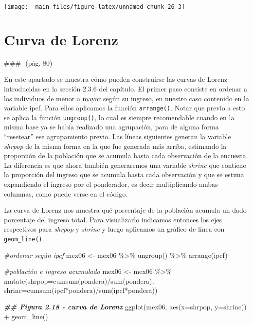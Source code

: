 \documentclass[
]{book}
\newenvironment{Shaded}{\begin{snugshade}}{\end{snugshade}}
\newcommand{\AttributeTok}[1]{\textcolor[rgb]{0.77,0.63,0.00}{#1}}
\newcommand{\CommentTok}[1]{\textcolor[rgb]{0.56,0.35,0.01}{\textit{#1}}}
\newcommand{\DocumentationTok}[1]{\textcolor[rgb]{0.56,0.35,0.01}{\textbf{\textit{#1}}}}
\newcommand{\FunctionTok}[1]{\textcolor[rgb]{0.00,0.00,0.00}{#1}}
\newcommand{\NormalTok}[1]{#1}
\newcommand{\OtherTok}[1]{\textcolor[rgb]{0.56,0.35,0.01}{#1}}
\newcommand{\SpecialCharTok}[1]{\textcolor[rgb]{0.00,0.00,0.00}{#1}}
\begin{document}
\texttt{[image: \_main\_files/figure-latex/unnamed-chunk-26-3]}

\hypertarget{curva-de-lorenz}{%
\section{Curva de Lorenz}\label{curva-de-lorenz}}

\#\#\#- (pág. 80)

En este apartado se muestra cómo pueden construirse las curvas de Lorenz introducidas en la sección 2.3.6 del capítulo. El primer paso consiste en ordenar a los individuos de menor a mayor según su ingreso, en nuestro caso contenido en la variable ipcf. Para ellos aplicamos la función \texttt{arrange()}. Notar que previo a esto se aplica la función \texttt{ungroup()}, lo cual es siempre recomendable cuando en la misma base ya se había realizado una agrupación, para de alguna forma ``resetear'' ese agrupamiento previo. Las líneas siguientes generan la variable \emph{shrpop} de la misma forma en la que fue generada más arriba, estimando la proporción de la población que se acumula hasta cada observación de la encuesta. La diferencia es que ahora también generaremos una variable \emph{shrinc} que contiene la proporción del ingreso que se acumula hasta cada observación y que se estima expandiendo el ingreso por el ponderador, es decir multiplicando ambas columnas, como puede verse en el código.

La curva de Lorenz nos muestra qué porcentaje de la población acumula un dado porcentaje del ingreso total. Para visualizarlo indicamos entonces los ejes respectivos para \emph{shrpop} y \emph{shrinc} y luego aplicamos un gráfico de línea con \texttt{geom\_line()}.

\begin{Shaded}
\begin{Highlighting}[]
\CommentTok{\#ordenar según ipcf}
\NormalTok{mex06 }\OtherTok{\textless{}{-}}\NormalTok{ mex06 }\SpecialCharTok{\%\textgreater{}\%} \FunctionTok{ungroup}\NormalTok{() }\SpecialCharTok{\%\textgreater{}\%} \FunctionTok{arrange}\NormalTok{(ipcf)}

\CommentTok{\#población e ingreso acumulado}
\NormalTok{mex06 }\OtherTok{\textless{}{-}}\NormalTok{ mex06 }\SpecialCharTok{\%\textgreater{}\%} \FunctionTok{mutate}\NormalTok{(}\AttributeTok{shrpop=}\FunctionTok{cumsum}\NormalTok{(pondera)}\SpecialCharTok{/}\FunctionTok{sum}\NormalTok{(pondera),}
                          \AttributeTok{shrinc=}\FunctionTok{cumsum}\NormalTok{(ipcf}\SpecialCharTok{*}\NormalTok{pondera)}\SpecialCharTok{/}\FunctionTok{sum}\NormalTok{(ipcf}\SpecialCharTok{*}\NormalTok{pondera)) }

\DocumentationTok{\#\# Figura 2.18 {-} curva de Lorenz }
\FunctionTok{ggplot}\NormalTok{(mex06, }\FunctionTok{aes}\NormalTok{(}\AttributeTok{x=}\NormalTok{shrpop, }\AttributeTok{y=}\NormalTok{shrinc)) }\SpecialCharTok{+}
  \FunctionTok{geom\_line}\NormalTok{()}
\end{Highlighting}
\end{Shaded}
\end{document}
